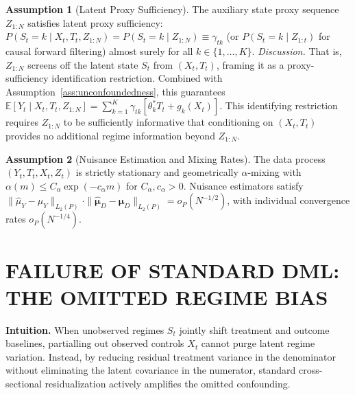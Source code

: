 \documentclass[twoside]{article}
\theoremstyle{definition}
\newtheorem{assumption}{Assumption}
\newcommand{\E}{\mathbb{E}}
\begin{document}
\begin{assumption}[Latent Proxy Sufficiency]
\label{ass:innovation}
The auxiliary state proxy sequence $Z_{1:N}$ satisfies latent proxy sufficiency: $P(S_t = k \mid X_t, T_t, Z_{1:N}) = P(S_t = k \mid Z_{1:N}) \equiv \gamma_{tk}$ (or $P(S_t = k \mid Z_{1:t})$ for causal forward filtering) almost surely for all $k \in \{1, \dots, K\}$.
\textit{Discussion.} That is, $Z_{1:N}$ screens off the latent state $S_t$ from $(X_t, T_t)$, framing it as a proxy-sufficiency identification restriction. Combined with Assumption~\ref{ass:unconfoundedness}, this guarantees $\E[Y_t \mid X_t, T_t, Z_{1:N}] = \sum_{k=1}^K \gamma_{tk} [\theta_k^* T_t + g_k(X_t)]$. This identifying restriction requires $Z_{1:N}$ to be sufficiently informative that conditioning on $(X_t, T_t)$ provides no additional regime information beyond $Z_{1:N}$.
\end{assumption}

\begin{assumption}[Nuisance Estimation and Mixing Rates]
\label{ass:rates}
\label{ass:mixing}
The data process $(Y_t, T_t, X_t, Z_t)$ is strictly stationary and geometrically $\alpha$-mixing with $\alpha(m) \le C_\alpha \exp(-c_\alpha m)$ for $C_\alpha, c_\alpha > 0$. Nuisance estimators satisfy $\|\hat{\mu}_Y - \mu_Y\|_{L_2(P)} \cdot \|\hat{\boldsymbol{\mu}}_D - \boldsymbol{\mu}_D\|_{L_2(P)} = o_P(N^{-1/2})$, with individual convergence rates $o_P(N^{-1/4})$.
\end{assumption}

\section{FAILURE OF STANDARD DML: THE OMITTED REGIME BIAS}
\label{sec:bias}

\textbf{Intuition.} When unobserved regimes $S_t$ jointly shift treatment and outcome baselines, partialling out observed controls $X_t$ cannot purge latent regime variation. Instead, by reducing residual treatment variance in the denominator without eliminating the latent covariance in the numerator, standard cross-sectional residualization actively amplifies the omitted confounding.
\end{document}
